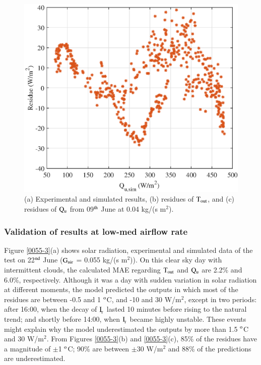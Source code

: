 \begin{figure}[ht!]
\begin{minipage}{0.39\columnwidth}
		\includegraphics[scale=0.5,width=1.0\columnwidth]{figs/004-residue-6.eps}
	\end{minipage}
	
	\caption{(a) Experimental and simulated results, (b) residues of $\rm{T_{out}}$, and (c) residues of $\rm{Q_{u}}$ from 09$^{\rm{th}}$ June at 0.04 kg/(s m$^2$).}
	\label{004-3}
\end{figure}


\newpage
\subsubsection{Validation of results at low-med airflow rate}

Figure \ref{0055-3}(a) shows solar radiation, experimental and simulated data of the test on 22$^{\rm{nd}}$ June ($\rm{G_{air}}$ = 0.055 kg/(s m$^2$)). On this clear sky day with intermittent clouds, the calculated MAE regarding $\rm{T_{out}}$ and $\rm{Q_{u}}$ are 2.2\% and 6.0\%, respectively. Although it was a day with sudden variation in solar radiation at different moments, the model predicted the outputs in which most of the residues are between -0.5 and 1 $^{\rm{o}}$C, and -10 and 30 W/m$^2$, except in two periods: after 16:00, when the decay of $\rm{I_{\!_T}}$ lasted 10 minutes before rising to the natural trend; and shortly before 14:00, when $\rm{I_{\!_T}}$ became highly unstable. These events might explain why the model underestimated the outputs by more than 1.5 $^{\rm{o}}$C and 30 W/m$^2$. From Figures \ref{0055-3}(b) and \ref{0055-3}(c), 85\% of the residues have a magnitude of $\pm$1 $^{\rm{o}}$C;  90\% are between $\pm$30 W/m$^2$ and 88\% of the predictions are underestimated.

